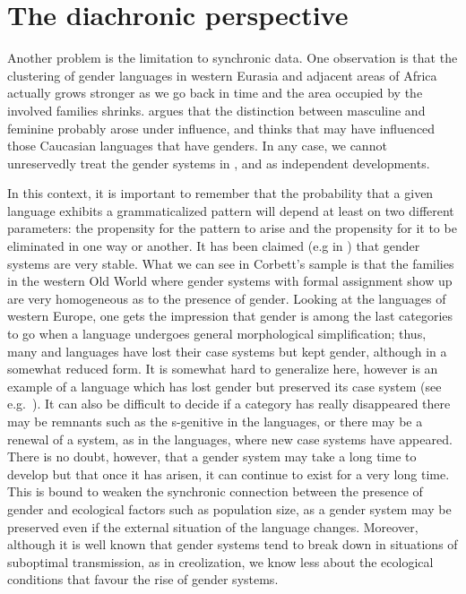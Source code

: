 \documentclass[output=collectionpaper]{langsci/langscibook}
\begin{document}
\section{The diachronic perspective}

Another problem is the limitation to synchronic data. One observation is that the clustering of gender languages in western Eurasia and adjacent areas of Africa actually grows stronger as we go back in time and the area occupied by the involved families shrinks. \citet[252]{Levins2002} argues that the  distinction between masculine and feminine probably arose under  influence, and \citet{Matasovic2012} thinks that  may have influenced those Caucasian languages that have genders. In any case, we cannot unreservedly treat the gender systems in ,  and  as independent developments.

In this context, it is important to remember that the probability that a given language exhibits a grammaticalized pattern will depend at least on two different parameters: the propensity for the pattern to arise and the propensity for it to be eliminated in one way or another. It has been claimed (e.g in \citealt[199]{Dahl2004}) that gender systems are very stable. What we can see in Corbett’s sample is that the families in the western Old World where gender systems with formal assignment show up are very homogeneous as to the presence of gender. Looking at the languages of western Europe, one gets the impression that gender is among the last categories to go when a language undergoes general morphological simplification; thus, many  and  languages have lost their case systems but kept gender, although in a somewhat reduced form. It is somewhat hard to generalize here, however \textendash{}  is an example of a language which has lost gender but preserved its case system (see e.g.\ \citealt{Kulikov2006}). It can also be difficult to decide if a category has really disappeared \textendash{} there may be remnants such as the s-genitive in the  languages, or there may be a renewal of a system, as in the  languages, where new case systems have appeared. There is no doubt, however, that a gender system may take a long time to develop but that once it has arisen, it can continue to exist for a very long time. This is bound to weaken the synchronic connection between the presence of gender and ecological factors such as population size, as a gender system may be preserved even if the external situation of the language changes. Moreover, although it is well known that gender systems tend to break down in situations of suboptimal transmission, as in creolization, we know less about the ecological conditions that favour the rise of gender systems.
\end{document}
